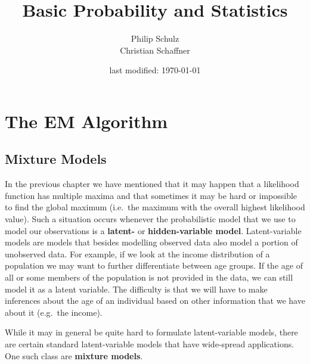 \documentclass[11pt,leqno,a4paper]{report}\usepackage[]{graphicx}\usepackage[]{color}
\author{Philip Schulz \\ Christian Schaffner}
\title{Basic Probability and Statistics}
\date{last modified: \today}
\begin{document}
\begin{titlepage}
\maketitle
\end{titlepage}

\tableofcontents
\graphicspath{{../chapter3/}{../chapter5/}{../chapter6/}}

\newpage

\clearpage
\setcounter{page}{1}








\chapter{The EM Algorithm}

\section{Mixture Models}\label{sec:mixtureModels}

In the previous chapter we have mentioned that it may happen that a likelihood function has multiple 
maxima and that sometimes it may be hard or impossible to find the global maximum (i.e.\ the maximum
with the overall highest likelihood value). Such a situation occurs whenever the probabilistic model
that we use to model our observations is a \textbf{latent-} or \textbf{hidden-variable model}. Latent-variable
models are models that besides modelling observed data also model a portion of unobserved data. For
example, if we look at the income distribution of a population we may want to further differentiate
between age groups. If the age of all or some members of the population is not provided in the data, we
can still model it as a latent variable. The difficulty is that we will have to make inferences about the
age of an individual based on other information that we have about it (e.g.\ the income). 

While it may in general be quite hard to formulate latent-variable models, there are certain standard
latent-variable models that have wide-spread applications. One such class are \textbf{mixture models}.
\end{document}
